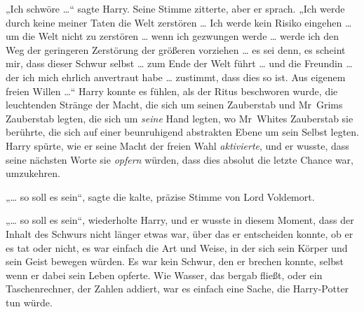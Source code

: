 „Ich schwöre …“ sagte Harry.
Seine Stimme zitterte, aber er sprach.
„Ich werde durch keine meiner Taten die Welt zerstören … Ich werde kein Risiko eingehen … um die Welt nicht zu zerstören … wenn ich gezwungen werde … werde ich den Weg der geringeren Zerstörung der größeren vorziehen … es sei denn, es scheint mir, dass dieser Schwur selbst … zum Ende der Welt führt … und die Freundin … der ich mich ehrlich anvertraut habe … zustimmt, dass dies so ist. Aus eigenem freien Willen …“
Harry konnte es fühlen, als der Ritus beschworen wurde, die leuchtenden Stränge der Macht, die sich um seinen Zauberstab und Mr~Grims Zauberstab legten, die sich um \emph{seine} Hand legten, wo Mr~Whites Zauberstab sie berührte, die sich auf einer beunruhigend abstrakten Ebene um sein Selbst legten. Harry spürte, wie er seine Macht der freien Wahl \emph{aktivierte}, und er wusste, dass seine nächsten Worte sie \emph{opfern} würden, dass dies absolut die letzte Chance war, umzukehren.

„… so soll es sein“, sagte die kalte, präzise Stimme von Lord Voldemort.

„… so soll es sein“, wiederholte Harry, und er wusste in diesem Moment, dass der Inhalt des Schwurs nicht länger etwas war, über das er entscheiden konnte, ob er es tat oder nicht, es war einfach die Art und Weise, in der sich sein Körper und sein Geist bewegen würden. Es war kein Schwur, den er brechen konnte, selbst wenn er dabei sein Leben opferte. Wie Wasser, das bergab fließt, oder ein Taschenrechner, der Zahlen addiert, war es einfach eine Sache, die Harry-Potter tun würde.

